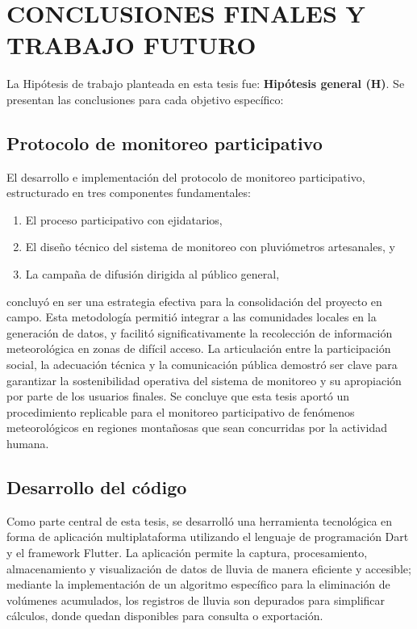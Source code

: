 \chapter{CONCLUSIONES FINALES Y TRABAJO FUTURO}
La Hipótesis de trabajo planteada en esta tesis fue: \textbf{Hipótesis general (H)}. Se presentan las conclusiones para cada objetivo específico:
\section{Protocolo de monitoreo participativo}
El desarrollo e implementación del protocolo de monitoreo participativo, estructurado en tres componentes fundamentales:

\begin{enumerate}
  \item El proceso participativo con ejidatarios,
  \item El diseño técnico del sistema de monitoreo con pluviómetros artesanales, y
  \item La campaña de difusión dirigida al público general,
\end{enumerate}

concluyó en ser una estrategia efectiva para la consolidación del proyecto en campo. Esta metodología permitió integrar a las comunidades locales en la generación de datos, y facilitó significativamente la recolección de información meteorológica en zonas de difícil acceso. La articulación entre la participación social, la adecuación técnica y la comunicación pública demostró ser clave para garantizar la sostenibilidad operativa del sistema de monitoreo y su apropiación por parte de los usuarios finales. Se concluye que esta tesis aportó un procedimiento replicable para el monitoreo participativo de fenómenos meteorológicos en regiones montañosas que sean concurridas por la actividad humana.


\section{Desarrollo del código}

Como parte central de esta tesis, se desarrolló una herramienta tecnológica en forma de aplicación multiplataforma utilizando el lenguaje de programación Dart y el framework Flutter. La aplicación permite la captura, procesamiento, almacenamiento y visualización de datos de lluvia de manera eficiente y accesible; mediante la implementación de un algoritmo específico para la eliminación de volúmenes acumulados, los registros de lluvia son depurados para simplificar cálculos, donde quedan disponibles para consulta o exportación.

